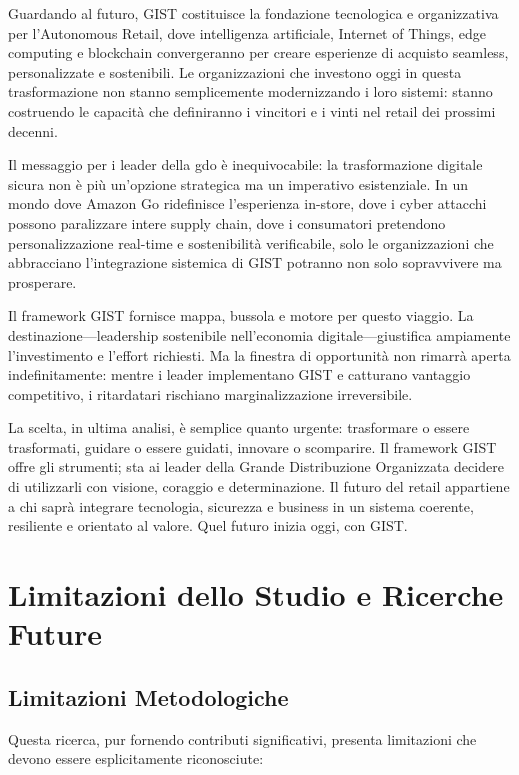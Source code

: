Guardando al futuro, GIST costituisce la fondazione tecnologica e organizzativa per l'Autonomous Retail, dove intelligenza artificiale, Internet of Things, edge computing e blockchain convergeranno per creare esperienze di acquisto seamless, personalizzate e sostenibili. Le organizzazioni che investono oggi in questa trasformazione non stanno semplicemente modernizzando i loro sistemi: stanno costruendo le capacità che definiranno i vincitori e i vinti nel retail dei prossimi decenni.

Il messaggio per i leader della \gls{gdo} è inequivocabile: la trasformazione digitale sicura non è più un'opzione strategica ma un imperativo esistenziale. In un mondo dove Amazon Go ridefinisce l'esperienza in-store, dove i cyber attacchi possono paralizzare intere supply chain, dove i consumatori pretendono personalizzazione real-time e sostenibilità verificabile, solo le organizzazioni che abbracciano l'integrazione sistemica di GIST potranno non solo sopravvivere ma prosperare.

Il framework GIST fornisce mappa, bussola e motore per questo viaggio. La destinazione—leadership sostenibile nell'economia digitale—giustifica ampiamente l'investimento e l'effort richiesti. Ma la finestra di opportunità non rimarrà aperta indefinitamente: mentre i leader implementano GIST e catturano vantaggio competitivo, i ritardatari rischiano marginalizzazione irreversibile.

La scelta, in ultima analisi, è semplice quanto urgente: trasformare o essere trasformati, guidare o essere guidati, innovare o scomparire. Il framework GIST offre gli strumenti; sta ai leader della Grande Distribuzione Organizzata decidere di utilizzarli con visione, coraggio e determinazione. Il futuro del retail appartiene a chi saprà integrare tecnologia, sicurezza e business in un sistema coerente, resiliente e orientato al valore. Quel futuro inizia oggi, con GIST.

\section{Limitazioni dello Studio e Ricerche Future}

\subsection{Limitazioni Metodologiche}

Questa ricerca, pur fornendo contributi significativi, presenta limitazioni che devono essere esplicitamente riconosciute:


